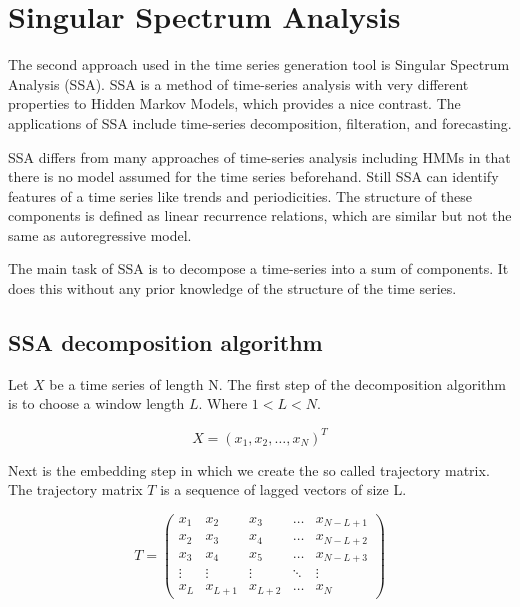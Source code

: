
\chapter{Singular Spectrum Analysis}\label{chapter:ssa}

The second approach used in the time series generation tool is Singular Spectrum Analysis (SSA). SSA is a method of time-series analysis with very different properties to Hidden Markov Models, which provides a nice contrast. The applications of SSA include time-series decomposition, filteration, and forecasting. \parencite{golyandina2013singular}

SSA differs from many approaches of time-series analysis including HMMs in that there is no model assumed for the time series beforehand. Still SSA can identify features of a time series like trends and periodicities. The structure of these components is defined as linear recurrence relations, which are similar but not the same as autoregressive model. \parencite{golyandina2014basic}

The main task of SSA is to decompose a time-series into a sum of components. It does this without any prior knowledge of the structure of the time series. 

\section{SSA decomposition algorithm}

Let $X$ be a time series of length N. The first step of the decomposition algorithm is to choose a window length $L$. Where $1 < L < N$. 

\begin{equation}
   X = (x_1, x_2, \ldots ,x_N)^T
\end{equation}

Next is the embedding step in which we create the so called trajectory matrix. The trajectory matrix $T$ is a sequence of lagged vectors of size L. 

\begin{equation}
   T = 
\left(\begin{array}{ccccc}
x_{1} & x_{2} & x_{3} & \dots & x_{N-L+1} \\
x_{2} & x_{3} & x_{4} & \dots & x_{N-L+2} \\
x_{3} & x_{4} & x_{5} & \dots & x_{N-L+3} \\
\vdots & \vdots & \vdots & \ddots & \vdots \\
x_{L} & x_{L+1} & x_{L+2} & \dots & x_{N}
\end{array}\right)
   \label{eq:ssa-trajectory}
\end{equation}

